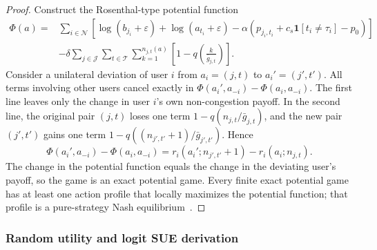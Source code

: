 \documentclass[11pt,a4paper]{article}
\newcommand{\qos}{q}
\newcommand{\T}{\mathcal{T}}
\newcommand{\J}{\mathcal{J}}
\newcommand{\N}{\mathcal{N}}
\begin{document}
\begin{proof}
Construct the Rosenthal-type potential function
\begin{align}
  \Phi(a)=
  &\sum_{i\in\N}
  \left[\log(b_{j_i}+\varepsilon)+\log(a_{t_i}+\varepsilon)
  -\alpha\left(p_{j_i,t_i}+c_s\mathbf{1}[t_i\ne \tau_i]-p_0\right)\right] \nonumber\\
  &-\delta\sum_{j\in\J}\sum_{t\in\T}
  \sum_{k=1}^{n_{j,t}(a)}
  \left[1-\qos\!\left(\frac{k}{\bar g_{j,t}}\right)\right].
  \label{eq:potential}
\end{align}
Consider a unilateral deviation of user $i$ from $a_i=(j,t)$ to $a_i'=(j',t')$. All terms involving other users cancel exactly in $\Phi(a_i',a_{-i})-\Phi(a_i,a_{-i})$. The first line leaves only the change in user $i$'s own non-congestion payoff. In the second line, the original pair $(j,t)$ loses one term $1-\qos(n_{j,t}/\bar g_{j,t})$, and the new pair $(j',t')$ gains one term $1-\qos((n_{j',t'}+1)/\bar g_{j',t'})$. Hence
\[
\Phi(a_i',a_{-i})-\Phi(a_i,a_{-i})
=r_i(a_i';n_{j',t'}+1)-r_i(a_i;n_{j,t}).
\]
The change in the potential function equals the change in the deviating user's payoff, so the game is an exact potential game. Every finite exact potential game has at least one action profile that locally maximizes the potential function; that profile is a pure-strategy Nash equilibrium~\cite{rosenthal1973class,monderer1996potential}.
\end{proof}

\subsubsection{Random utility and logit SUE derivation}
\end{document}
